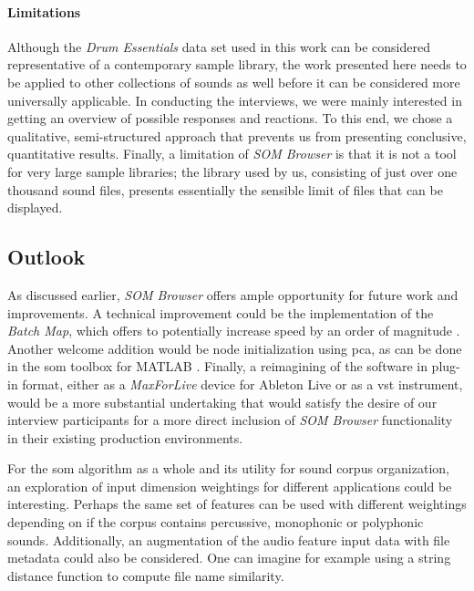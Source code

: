 \paragraph*{Limitations}
\label{par:discussion_limitations}
Although the \textit{Drum Essentials} data set used in this work can be
considered representative of a contemporary sample library, the work presented
here needs to be applied to other collections of sounds as well before it can
be considered more universally applicable. In conducting the interviews, we were
mainly interested in getting an overview of possible responses and reactions.
To this end, we chose a qualitative, semi-structured approach that prevents us
from presenting conclusive, quantitative results. Finally, a limitation of
\textit{SOM Browser} is that it is not a tool for very large sample libraries;
the library used by us, consisting of just over one thousand sound files,
presents essentially the sensible limit of files that can be displayed.

\subsection{Outlook}
\label{subsubsec:discussion_outlook}
As discussed earlier, \textit{SOM Browser} offers ample opportunity for future
work and improvements. A technical improvement could be the implementation of
the \textit{Batch Map}, which offers to potentially increase speed by an order
of magnitude \citep{web:kohonen2007}. Another welcome addition would be node
initialization using \gls{pca}, as can be done in the \gls{som} toolbox for
MATLAB \citep{vesanto2000}. Finally, a reimagining of the software in plug-in
format, either as a \textit{MaxForLive} device for Ableton Live or as a
\gls{vst} instrument, would be a more substantial undertaking that would satisfy
the desire of our interview participants for a more direct inclusion of
\textit{SOM Browser} functionality in their existing production environments.

\smallskip

For the \gls{som} algorithm as a whole and its utility for sound corpus
organization, an exploration of input dimension weightings for different
applications could be interesting. Perhaps the same set of features can be used
with different weightings depending on if the corpus contains percussive,
monophonic or polyphonic sounds. Additionally, an augmentation of the audio
feature input data with file metadata could also be considered. One can imagine
for example using a string distance function to compute file name similarity.



